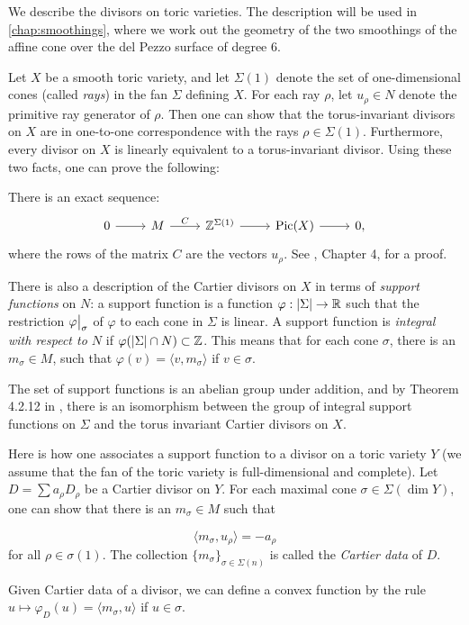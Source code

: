We describe the divisors on toric varieties. The description will be used in \cref{chap:smoothings}, where we work out the geometry of the two smoothings of the affine cone over the del Pezzo surface of degree $6$.

Let $X$ be a smooth toric variety, and let $\Sigma(1)$ denote the set of one-dimensional cones (called \emph{rays}) in the fan $\Sigma$ defining $X$. For each ray $\rho$, let $u_\rho \in N$ denote the primitive ray generator of $\rho$. Then one can show that the torus-invariant divisors on $X$ are in one-to-one correspondence with the rays $\rho \in \Sigma(1)$. Furthermore, every divisor on $X$ is linearly equivalent to a torus-invariant divisor. Using these two facts, one can prove the following:

There is an exact sequence:
\[
\begin{tikzcd}
0 \arrow{r} &  M \arrow{r}{C} & \Z^{\Sigma(1)}\arrow{r} & \Pic(X)   \arrow{r} & 0,
\end{tikzcd}
\]
where the rows of the matrix $C$ are the vectors $u_{\rho}$. See \cite{cox_toric}, Chapter 4, for a proof.

There is also a description of the Cartier divisors on $X$ in terms of \emph{support functions} on $N$: a support function is a function $\varphi:|\Sigma| \to \mathbb{R}$ such that the restriction $\restr{\varphi}{\sigma}$ of $\varphi$ to each cone in $\Sigma$ is linear. A support function is \emph{integral with respect to $N$} if $\varphi(|\Sigma| \cap N) \subset \mathbb{Z}$. This means that for each cone $\sigma$, there is an $m_\sigma \in M$, such that $\varphi(v)=\langle v, m_\sigma \rangle$ if $v \in \sigma$.

The set of support functions is an abelian group under addition, and by Theorem 4.2.12 in \cite{cox_toric}, there is an isomorphism between the group of integral support functions on $\Sigma$ and the torus invariant Cartier divisors on $X$.

Here is how one associates a support function to a divisor on a toric variety $Y$ (we assume that the fan of the toric variety is full-dimensional and complete). Let $D=\sum a_\rho D_\rho$ be a Cartier divisor on $Y$. For each maximal cone $\sigma \in \Sigma(\dim Y)$, one can show that there is an $m_\sigma \in M$ such that

\[
\langle m_\sigma , u_\rho \rangle = -a_\rho
\]
for all $\rho \in \sigma(1)$. The collection $\{ m_\sigma \}_{\sigma \in \Sigma(n)}$ is called the \emph{Cartier data} of $D$.

Given Cartier data of a divisor, we can define a convex function by the rule $u \mapsto \varphi_D(u)=\langle m_\sigma, u\rangle$ if $ u\in \sigma$. 

